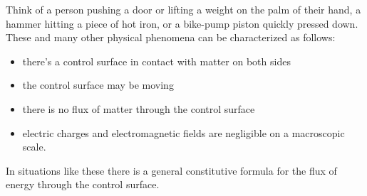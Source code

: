 \documentclass[a4paper,12pt,%
onecolumn,oneside,%
british%
]{memoir}
\renewcommand*{\|}[1][]{\nonscript\:#1\vert\nonscript\:\mathopen{}}
\begin{document}
%
%
Think of a person pushing a door or lifting a weight on the palm of their hand, a hammer hitting a piece of hot iron, or a bike-pump piston quickly pressed down. These and many other physical phenomena can be characterized as follows:
\begin{itemize}[nosep]
\item there's a control surface in contact with matter on both sides
\item the control surface may be moving
\item there is no flux of matter through the control surface
\item electric charges and electromagnetic fields are negligible on a macroscopic scale.
\end{itemize}
In situations like these there is a general constitutive formula for the flux of energy through the control surface.
\end{document}
